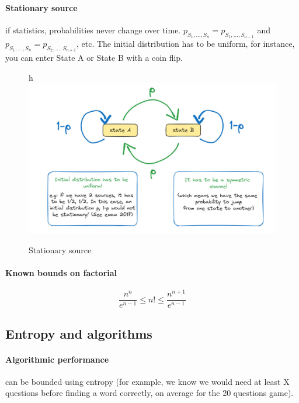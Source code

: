 \documentclass{article}
\begin{document}
\pagebreak

\paragraph{Stationary source} if statistics, probabilities never change over time. $ p_{S_1,...,S_n} = p_{S_1,...,S_{n-1}} $ and $ p_{S_1,...,S_n} = p_{S_2,...,S_{n+1}} $, etc.
The initial distribution has to be uniform, for instance, you can enter State A or State B with a coin flip.

\begin{figure}{h}
    \centering
    \includegraphics[width=1\linewidth]{stationary.jpg}
    \caption{Stationary source}
    \label{fig:enter-label}
\end{figure}

\paragraph{Known bounds on factorial}

\[ \frac{n^n}{e^{n-1}} \leq n! \leq \frac{n^{n+1}}{e^{n-1}} \]

\subsection{Entropy and algorithms}

\paragraph{Algorithmic performance} can be bounded using entropy (for example, we know we would need at least X questions before finding a word correctly, on average for the 20 questions game).

\newpage
\end{document}
